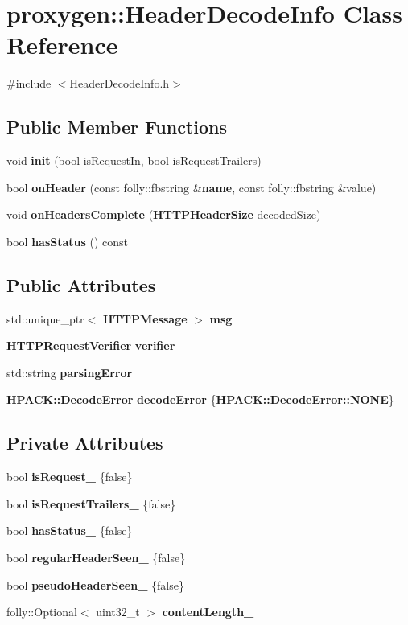 \section{proxygen\+:\+:Header\+Decode\+Info Class Reference}
\label{classproxygen_1_1HeaderDecodeInfo}


{\ttfamily \#include $<$Header\+Decode\+Info.\+h$>$}

\subsection*{Public Member Functions}
\begin{DoxyCompactItemize}
\item 
void {\bf init} (bool is\+Request\+In, bool is\+Request\+Trailers)
\item 
bool {\bf on\+Header} (const folly\+::fbstring \&{\bf name}, const folly\+::fbstring \&value)
\item 
void {\bf on\+Headers\+Complete} ({\bf H\+T\+T\+P\+Header\+Size} decoded\+Size)
\item 
bool {\bf has\+Status} () const 
\end{DoxyCompactItemize}
\subsection*{Public Attributes}
\begin{DoxyCompactItemize}
\item 
std\+::unique\+\_\+ptr$<$ {\bf H\+T\+T\+P\+Message} $>$ {\bf msg}
\item 
{\bf H\+T\+T\+P\+Request\+Verifier} {\bf verifier}
\item 
std\+::string {\bf parsing\+Error}
\item 
{\bf H\+P\+A\+C\+K\+::\+Decode\+Error} {\bf decode\+Error} \{{\bf H\+P\+A\+C\+K\+::\+Decode\+Error\+::\+N\+O\+NE}\}
\end{DoxyCompactItemize}
\subsection*{Private Attributes}
\begin{DoxyCompactItemize}
\item 
bool {\bf is\+Request\+\_\+} \{false\}
\item 
bool {\bf is\+Request\+Trailers\+\_\+} \{false\}
\item 
bool {\bf has\+Status\+\_\+} \{false\}
\item 
bool {\bf regular\+Header\+Seen\+\_\+} \{false\}
\item 
bool {\bf pseudo\+Header\+Seen\+\_\+} \{false\}
\item 
folly\+::\+Optional$<$ uint32\+\_\+t $>$ {\bf content\+Length\+\_\+}
\end{DoxyCompactItemize}


